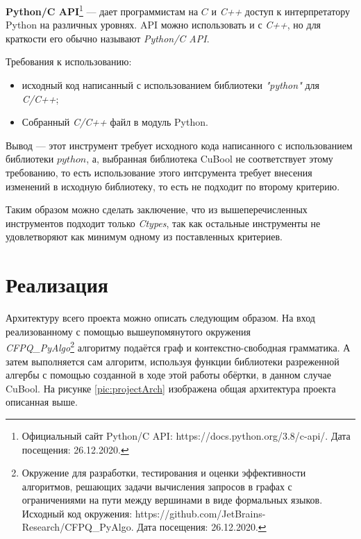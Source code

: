 \documentclass[14pt]{matmex-diploma}
\begin{document}
\textbf{Python/C API}\footnote{
Официальный сайт Python/C API: https://docs.python.org/3.8/c-api/.
Дата посещения: 26.12.2020.}
--- 
дает программистам на $C$ и \textit{C++} доступ к интерпретатору Python на различных уровнях.
API можно использовать и с \textit{C++}, но для краткости его обычно называют \textit{Python/C API}.

Требования к использованию:
\begin{itemize}
    \item исходный код написанный с использованием библиотеки \textit{"python"} для \textit{C/C++};
    \item Собранный \textit{C/C++} файл в модуль Python.
\end{itemize}

Вывод ---  этот инструмент требует исходного кода
написанного с использованием библиотеки $python$, 
а, выбранная библиотека CuBool не соответствует этому требованию,
то есть использование этого интсрумента требует внесения
изменений в исходную библиотеку, то есть не подходит по второму критерию.

Таким образом можно сделать заключение, что из вышеперечисленных инструментов подходит только \textit{Ctypes},
так как остальные инструменты не удовлетворяют как минимум одному из поставленных критериев.

\section{Реализация}
Архитектуру всего проекта можно описать следующим образом. 
На вход реализованному с помощью вышеупомянутого окружения \\ \textit{CFPQ\_PyAlgo}\footnote{
Окружение для разработки, тестирования и оценки эффективности 
алгоритмов, решающих задачи вычисления запросов в графах с ограничениями на пути между вершинами в виде формальных языков.
Исходный код окружения: https://github.com/JetBrains-Research/CFPQ\_PyAlgo. Дата посещения: 26.12.2020.
} алгоритму
подаётся граф и контекстно-свободная грамматика.
А затем выполняется сам алгоритм, используя функции библиотеки разреженной алгербы с помощью созданной в ходе этой работы обёртки, в данном случае CuBool.
На рисунке \ref{pic:projectArch} изображена общая архитектура проекта описанная выше.
\end{document}
